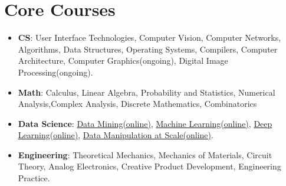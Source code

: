 \documentclass[letterpaper,11pt]{article}
\newcommand{\resumeItem}[2]{
  \item\small{
    \textbf{#1}{: #2 \vspace{-2pt}}
  }
}
\newcommand{\resumeSubItem}[2]{\resumeItem{#1}{#2}\vspace{-4pt}}
\newcommand{\resumeSubHeadingListStart}{\begin{itemize}[leftmargin=*]}
\newcommand{\resumeSubHeadingListEnd}{\end{itemize}}
\begin{document}
\section{Core Courses}
\resumeSubHeadingListStart
\resumeSubItem{\small{CS}}
{{User Interface Technologies, Computer Vision, Computer Networks, Algorithms, Data Structures, Operating Systems, Compilers, Computer Architecture, Computer Graphics(ongoing), Digital Image Processing(ongoing).}}
\resumeSubItem{Math}
{Calculus, Linear Algebra, Probability and Statistics, Numerical Analysis,Complex Analysis, Discrete Mathematics, Combinatorics}
\resumeSubItem{Data Science}
{\href {https://www.coursera.org/account/accomplishments/verify/LWTSBR9KPCBS}{{Data Mining(online)}}, \href{https://www.coursera.org/account/accomplishments/verify/PUK2K8PA69QF
}{{Machine Learning(online)}}, \href{https://www.coursera.org/account/accomplishments/specialization/QF7KAZ8WKEB2}{{Deep Learning(online)}}, \href{https://www.coursera.org/account/accomplishments/verify/YW47GT8YU4G8}{{Data Manipulation at Scale(online)}}.}
\resumeSubItem{Engineering}
{Theoretical Mechanics, Mechanics of Materials, Circuit Theory, Analog Electronics, Creative Product Development, Engineering Practice.}

\resumeSubHeadingListEnd
\end{document}
